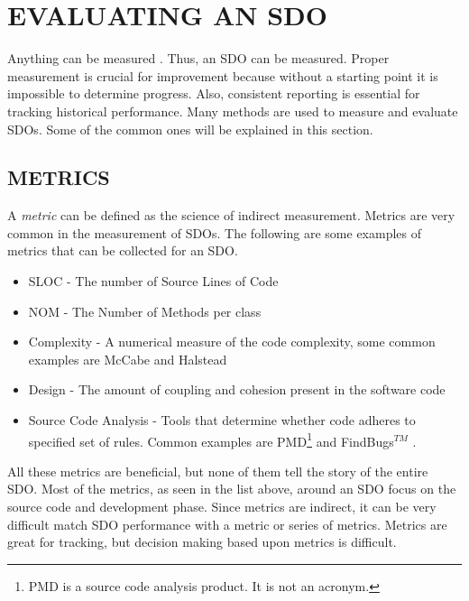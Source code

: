 \documentclass[SDSUThesis.tex]{subfiles}
\begin{document}
\section{EVALUATING AN SDO}

    Anything can be measured \cite{Hubbard2010}.  Thus, an SDO can be 
    measured.  Proper measurement is crucial for improvement because
    without a starting point it is impossible to determine progress.
    Also, consistent reporting is essential for 
    tracking historical performance.  Many methods are used
    to measure and evaluate SDOs.  Some of the common ones
    will be explained in this section.


    \subsection{METRICS}
        A \textit{metric} can be defined as the science of indirect measurement. Metrics
        are very common in the measurement of SDOs.  
        The following are some examples of metrics that can be collected 
        for an SDO. 
        \begin{itemize}
            \item SLOC - The number of Source Lines of Code 
            \item NOM - The Number of Methods per class
            \item Complexity - A numerical measure of the code complexity,
                some common examples are McCabe \cite{McCabe1976} and 
                Halstead \cite{Halstead1977}
            \item Design - The amount of coupling and cohesion present 
                in the software code
            \item Source Code Analysis - Tools that determine whether 
                code adheres to specified set of rules. Common 
                examples are PMD\footnote{PMD is a source code analysis product.  
                It is not an acronym.} and FindBugs$^{TM}$ \cite{PMD, Findbugs}.
        \end{itemize}
        All these metrics are beneficial, but none of them tell the story of the entire
        SDO.  Most of the metrics, as seen in the list above, around an SDO focus on 
        the source code and development phase. 
        Since metrics are indirect, it can be very difficult match SDO performance with
        a metric or series of metrics.  Metrics are great for tracking, but decision making
        based upon metrics is difficult.  
\end{document}

